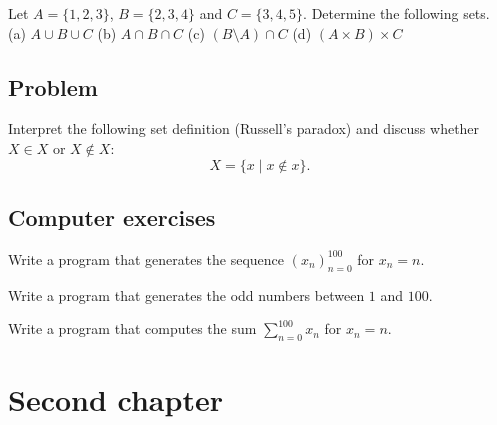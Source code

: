 \documentclass{tstextbook}
\begin{document}
    \begin{exercise}
        Let $A = \{1, 2, 3\}$, $B = \{2, 3, 4\}$ and $C = \{3, 4, 5\}$.
        Determine the following sets. \\
        (a) $A \cup B \cup C$ \quad
        (b) $A \cap B \cap C$ \quad
        (c) $(B \setminus A) \cap C$ \quad
        (d) $(A \times B) \times C$
    \end{exercise}

    \section*{Problem}

    \begin{problem}
        Interpret the following set definition (Russell's paradox) and discuss
        whether $X \in X$ or $X \notin X$:
        \begin{equation}
            X = \{x \mid x \notin x\}.
        \end{equation}
    \end{problem}

    \section*{Computer exercises}

    \begin{programming}
        Write a program that generates the sequence $(x_n)_{n=0}^{100}$
        for $x_n = n$.
    \end{programming}

    \begin{programming}
        Write a program that generates the odd numbers between $1$ and $100$.
    \end{programming}

    \begin{programming}
        Write a program that computes the sum $\sum_{n=0}^{100} x_n$
        for $x_n = n$.
    \end{programming}



    \chapter{Second chapter}

    \begin{summary}
        \blindtext
    \end{summary}
\end{document}
